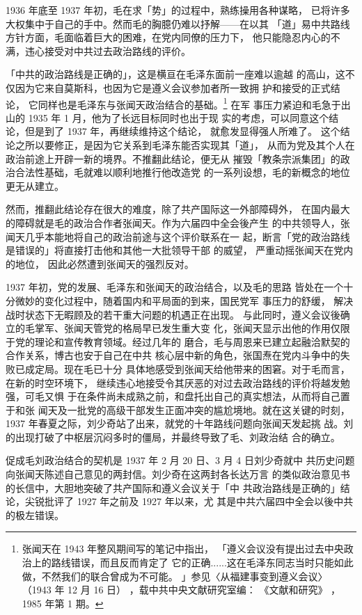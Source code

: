 1936 年底至 1937 年初，毛在求「势」的过程中，熟练操用各种谋略，
已将许多大权集中于自己的手中。然而毛的胸臆仍难以抒解——在以其
「道」易中共路线方针方面，毛面临着巨大的困难，在党内同僚的压力下，
他只能隐忍内心的不满，违心接受对中共过去政治路线的评价。

「中共的政治路线是正确的」，这是横亘在毛泽东面前一座难以逾越
的高山，这不仅因为它来自莫斯科，也因为它是遵义会议参加者所一致拥
护和接受的正式结论，
它同样也是毛泽东与张闻天政治结合的基础。\footnote{张闻天在 1943 年整风期间写的笔记中指出，
「遵义会议没有提出过去中央政治上的路线错误，而且反而肯定了
它的正确......这在毛泽东同志当时只能如此做，不然我们的联合曾成为不可能。
」参见〈从福建事变到遵义会议〉
（1943
年 12 月 16 日）
，载中共中央文献研究室编：
《文献和研究》
，1985 年第 1 期。
} 在军
事压力紧迫和毛急于出山的 1935 年 1 月，他为了长远目标同时也出于现
实的考虑，可以同意这个结论，但是到了 1937 年，再继续维持这个结论，
就愈发显得强人所难了。
这个结论之所以要修正，是因为它关系到毛泽东能否实现其「道」，
从而为党及其个人在政治前途上开辟一新的境界。不推翻此结论，便无从
摧毁「教条宗派集团」的政治合法性基础，毛就难以顺利地推行他改造党
的一系列设想，毛的新概念的地位更无从建立。

然而，推翻此结论存在很大的难度，除了共产国际这一外部障碍外，
在国内最大的障碍就是毛的政治合作者张闻天。作为六届四中全会後产生
的中共领导人，张闻天几乎本能地将自己的政治前途与这个评价联系在一
起，断言「党的政治路线是错误的」将直接打击他和其他一大批领导干部
的威望，
严重动摇张闻天在党内的地位，
因此必然遭到张闻天的强烈反对。

1937 年初，党的发展、毛泽东和张闻天的政治结合，以及毛的思路
皆处在一个十分微妙的变化过程中，随着国内和平局面的到来，国民党军
事压力的舒缓，
解决战时状态下无暇顾及的若干重大问题的机遇正在出现。
与此同时，遵义会议後确立的毛掌军、张闻天管党的格局早已发生重大变
化，张闻天显示出他的作用仅限于党的理论和宣传教育领域。经过几年的
磨合，毛与周恩来已建立起融洽默契的合作关系，博古也安于自己在中共
核心层中新的角色，张国焘在党内斗争中的失败已成定局。现在毛已十分
具体地感受到张闻天给他带来的困窘。对于毛而言，在新的时空环境下，
继续违心地接受令其厌恶的对过去政治路线的评价将越发勉强，可毛又惧
于在条件尚未成熟之前，和盘托出自己的真实想法，从而将自己置于和张
闻天及一批党的高级干部发生正面冲突的尴尬境地。就在这关键的时刻，
1937 年春夏之际，刘少奇站了出来，就党的十年路线问题向张闻天发起挑
战。刘的出现打破了中枢层沉闷多时的僵局，并最终导致了毛、刘政治结
合的确立。

促成毛刘政治结合的契机是 1937 年 2 月 20 日、3 月 4 日刘少奇就中
共历史问题向张闻天陈述自己意见的两封信。刘少奇在这两封各长达万言
的类似政治意见书的长信中，大胆地突破了共产国际和遵义会议关于「中
共政治路线是正确的」结论，尖锐批评了 1927 年之前及 1927 年以来，尤
其是中共六届四中全会以後中共的极左错误。


